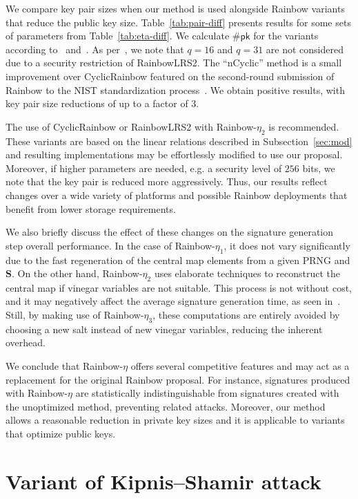 \documentclass[12pt, a4paper, oneside]{memoir}
\theoremstyle{definition}
\begin{document}
We compare key pair sizes when our method is used alongside Rainbow variants that reduce the public key size. Table~\ref{tab:pair-diff} presents results for some sets of parameters from Table~\ref{tab:eta-diff}. We calculate $\#\mathsf{pk}$ for the variants according to~\cite[Eqs.~9.2,~9.4]{Petzoldt:201307} and~\cite{Petzoldt:202004}. As per~\cite[Remark~9.1]{Petzoldt:201307}, we note that $q = 16$ and $q = 31$ are not considered due to a security restriction of RainbowLRS2. The ``nCyclic'' method is a small improvement over CyclicRainbow featured on the second-round submission of Rainbow to the NIST standardization process~\cite{Ding:201901}. We obtain positive results, with key pair size reductions of up to a factor of 3.

The use of CyclicRainbow or RainbowLRS2 with Rainbow-$\eta_{2}$ is recommended. These variants are based on the linear relations described in Subsection~\ref{sec:mod} and resulting implementations may be effortlessly modified to use our proposal. Moreover, if higher parameters are needed, e.g. a security level of $256$ bits, we note that the key pair is reduced more aggressively. Thus, our results reflect changes over a wide variety of platforms and possible Rainbow deployments that benefit from lower storage requirements.

We also briefly discuss the effect of these changes on the signature generation step overall performance. In the case of Rainbow-$\eta_{1}$, it does not vary significantly due to the fast regeneration of the central map elements from a given PRNG and $\mathbf{S}$. On the other hand, Rainbow-$\eta_{2}$ uses elaborate techniques to reconstruct the central map if vinegar variables are not suitable. This process is not without cost, and it may negatively affect the average signature generation time, as seen in~\cite{Petzoldt:202004}. Still, by making use of Rainbow-$\eta_{3}$, these computations are entirely avoided by choosing a new salt instead of new vinegar variables, reducing the inherent overhead.

We conclude that Rainbow-$\eta$ offers several competitive features and may act as a replacement for the original Rainbow proposal. For instance, signatures produced with Rainbow-$\eta$ are statistically indistinguishable from signatures created with the unoptimized method, preventing related attacks. Moreover, our method allows a reasonable reduction in private key sizes and it is applicable to variants that optimize public keys.

\chapter{Variant of Kipnis--Shamir attack}\label{ch:attack}
\end{document}
